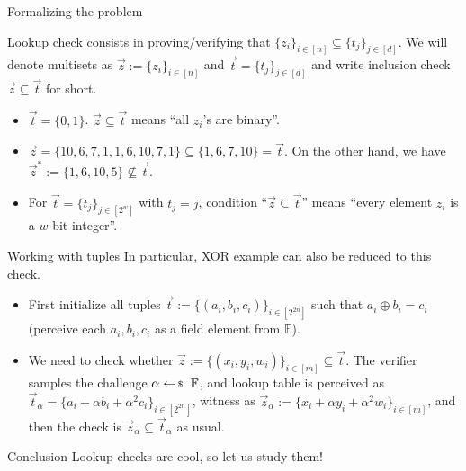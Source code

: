 \documentclass{zkdl-presentation-template}
\begin{document}
    \begin{frame}{Formalizing the problem}
        \begin{definition}
            Lookup check consists in proving/verifying that $\{z_i\}_{i \in [n]}
            \subseteq \{t_j\}_{j \in [d]}$. We will denote multisets as $\vec{z}
            := \{z_i\}_{i \in [n]}$ and $\vec{t} = \{t_j\}_{j \in [d]}$ and
            write inclusion check $\vec{z} \subseteq \vec{t}$ for short.\pause
        \end{definition}

        \begin{example}
            \begin{itemize}
                \item $\vec{t}=\{0,1\}$. $\vec{z} \subseteq \vec{t}$ means ``all $z_i$'s are binary''.\pause
                \item $\vec{z}=\{10,6,7,1,1,6,10,7,1\} \subseteq \{1,6,7,10\} = \vec{t}$. On the other hand, we 
                have $\vec{z}^* := \{1,6,10,5\} \not\subseteq \vec{t}$.\pause
                \item For $\vec{t} = \{t_j\}_{j \in [2^w]}$ with $t_j=j$,
                condition ``$\vec{z} \subseteq \vec{t}$'' means ``every element
                $z_i$ is a $w$-bit integer''.
            \end{itemize}
        \end{example}
    \end{frame}

    \begin{frame}{Working with tuples}
        In particular, XOR example can also be reduced to this check. 
        \begin{itemize}
            \item First initialize all tuples $\vec{t} := \{(a_i,b_i,c_i)\}_{i
            \in [2^{2n}]}$ such that $a_i \oplus b_i = c_i$ (perceive each
            $a_i,b_i,c_i$ as a field element from $\mathbb{F}$).\pause
            \item We need to check whether $\vec{z} := \{(x_i,y_i,w_i)\}_{i \in
            [m]} \subseteq \vec{t}$. The verifier samples the challenge $\alpha
            \leftarrowS \mathbb{F}$, and lookup table is perceived as
            $\vec{t}_{\alpha} = \{a_i+\alpha b_i+\alpha^2 c_i\}_{i \in [2^{2n}]}$,
            witness as $\vec{z}_{\alpha} := \{x_i+\alpha y_i + \alpha^2 w_i\}_{i
            \in [m]}$, and then the check is $\vec{z}_{\alpha} \subseteq
            \vec{t}_{\alpha}$ as usual.\pause
        \end{itemize}

        \begin{remarkblock}{Conclusion}
            Lookup checks are cool, so let us study them!
        \end{remarkblock}
    \end{frame}
\end{document}
